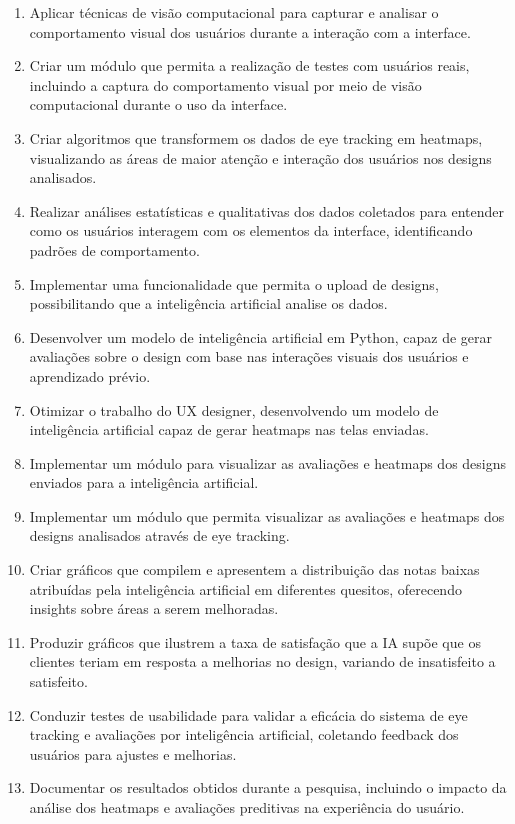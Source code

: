 \begin{enumerate}
    \item Aplicar técnicas de visão computacional para capturar e analisar o comportamento visual dos usuários durante a interação com a interface.
    \item Criar um módulo que permita a realização de testes com usuários reais, incluindo a captura do comportamento visual por meio de visão computacional durante o uso da interface.
    \item Criar algoritmos que transformem os dados de eye tracking em heatmaps, visualizando as áreas de maior atenção e interação dos usuários nos designs analisados.
    \item Realizar análises estatísticas e qualitativas dos dados coletados para entender como os usuários interagem com os elementos da interface, identificando padrões de comportamento.
    \item Implementar uma funcionalidade que permita o upload de designs, possibilitando que a inteligência artificial analise os dados.
    \item Desenvolver um modelo de inteligência artificial em Python, capaz de gerar avaliações sobre o design com base nas interações visuais dos usuários e aprendizado prévio.
    \item Otimizar o trabalho do UX designer, desenvolvendo um modelo de inteligência artificial capaz de gerar heatmaps nas telas enviadas.
    \item Implementar um módulo para visualizar as avaliações e heatmaps dos designs enviados para a inteligência artificial.
    \item Implementar um módulo que permita visualizar as avaliações e heatmaps dos designs analisados através de eye tracking.
    \item Criar gráficos que compilem e apresentem a distribuição das notas baixas atribuídas pela inteligência artificial em diferentes quesitos, oferecendo insights sobre áreas a serem melhoradas.
    \item Produzir gráficos que ilustrem a taxa de satisfação que a IA supõe que os clientes teriam em resposta a melhorias no design, variando de insatisfeito a satisfeito.
    \item Conduzir testes de usabilidade para validar a eficácia do sistema de eye tracking e avaliações por inteligência artificial, coletando feedback dos usuários para ajustes e melhorias.
    \item Documentar os resultados obtidos durante a pesquisa, incluindo o impacto da análise dos heatmaps e avaliações preditivas na experiência do usuário.
\end{enumerate}







